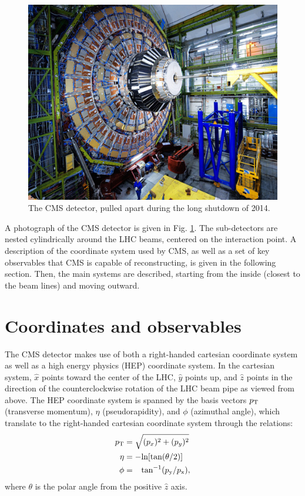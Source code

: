 \begin{figure}[h]
\centering
\includegraphics[width=0.6\linewidth]{figures/CMS/CMSBetter.jpg}
\caption{The CMS detector, pulled apart during the long shutdown of 2014. } 
\label{fig:CmsPulledApart}
\end{figure}
A photograph of the CMS detector is given in Fig. \ref{fig:CmsPulledApart}. The sub-detectors are nested cylindrically around the LHC beams, centered on the interaction point. A description of the coordinate system used by CMS, as well as a set of key observables that CMS is capable of reconstructing, is given in the following section. Then, the main systems are described, starting from the inside (closest to the beam lines) and moving outward.

\section{Coordinates and observables}
The CMS detector makes use of both a right-handed cartesian coordinate system as well as a high energy physics (HEP) coordinate system. In the cartesian system, $\hat{x}$ points toward the center of the LHC, $\hat{y}$ points up, and $\hat{z}$ points in the direction of the counterclockwise rotation of the LHC beam pipe as viewed from above. The HEP coordinate system is spanned by the basis vectors $p_{\text{T}}$ (transverse momentum), $\eta$ (pseudorapidity), and $\phi$ (azimuthal angle), which translate to the right-handed cartesian coordinate system through the relations:
\begin{align}
p_{\text{T}} &= \sqrt{(p_{x})^2+(p_{y})^2}\\
\eta &= -\text{ln}[\text{tan}(\theta/2)]\\
\phi &= \hphantom{-}\text{tan}^{-1}(p_{\text{y}}/p_{\text{x}}),
\end{align}
where $\theta$ is the polar angle from the positive $\hat{z}$ axis.

